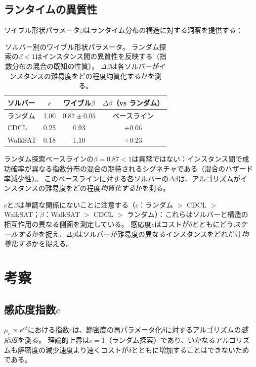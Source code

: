 \documentclass[11pt,a4paper]{article}
\newcommand{\mc}{\mu_c}
\begin{document}
\subsection{ランタイムの異質性}
\label{sec:heterogeneity}

ワイブル形状パラメータ$\beta$はランタイム分布の構造に対する洞察を提供する：

\begin{table}[h]
\centering
\begin{tabular}{lccc}
\toprule
ソルバー & $c$ & ワイブル$\beta$ & $\Delta\beta$（vs ランダム） \\
\midrule
ランダム   & 1.00 & $0.87 \pm 0.05$ & ベースライン \\
CDCL     & 0.25 & 0.93 & $+0.06$ \\
WalkSAT  & 0.18 & 1.10 & $+0.23$ \\
\bottomrule
\end{tabular}
\caption{ソルバー別のワイブル形状パラメータ。
ランダム探索の$\beta < 1$はインスタンス間の異質性を反映する（指数分布の混合の既知の性質）。
$\Delta\beta$は各ソルバーがインスタンスの難易度をどの程度均質化するかを測る。}
\label{tab:beta}
\end{table}

ランダム探索ベースラインの$\beta = 0.87 < 1$は異常ではない：インスタンス間で成功確率が異なる指数分布の混合の期待されるシグネチャである（混合のハザード率減少性）。
このベースラインに対する各ソルバーの$\Delta\beta$は、アルゴリズムがインスタンスの難易度をどの程度\emph{均質化する}かを測る。

$c$と$\beta$は単調な関係にないことに注意する（$c$：ランダム $>$ CDCL $>$ WalkSAT；$\beta$：WalkSAT $>$ CDCL $>$ ランダム）：これらはソルバーと構造の相互作用の異なる側面を測定している。
感応度$c$はコストが$\delta$とともにどう\emph{スケールする}かを捉え、$\Delta\beta$はソルバーが難易度の異なるインスタンスをどれだけ\emph{均等化する}かを捉える。


\section{考察}
\label{sec:discussion}

\subsection{感応度指数$c$}

$\mc \propto e^{c\delta}$における指数$c$は、節密度の再パラメータ化$\delta$に対するアルゴリズムの\emph{感応度}を測る。
理論的上界は$c = 1$（ランダム探索）であり、いかなるアルゴリズムも解密度の減少速度より速くコストが$\delta$とともに増加することはできないためである。
\end{document}
